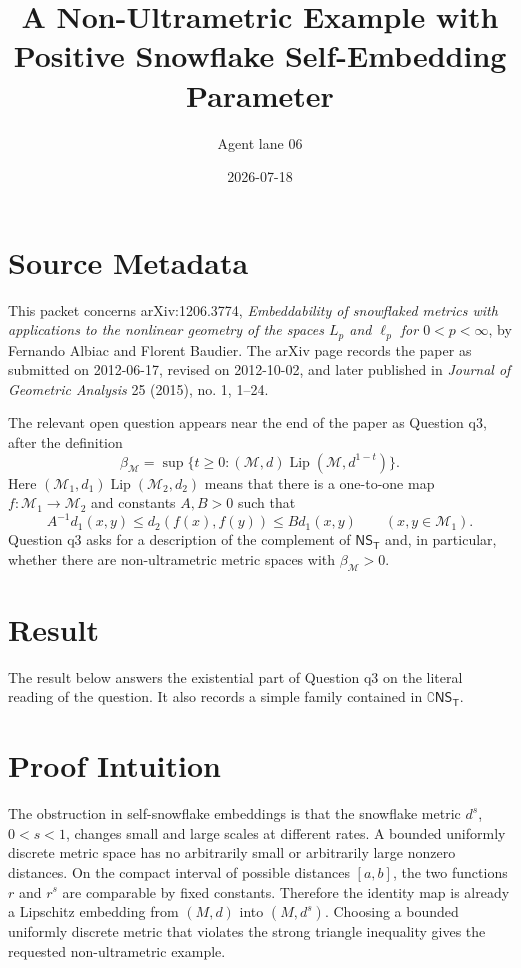 \documentclass[11pt]{article}
\title{A Non-Ultrametric Example with Positive Snowflake Self-Embedding Parameter}
\author{Agent lane 06}
\date{2026-07-18}
\newcommand{\Lip}{\operatorname{Lip}}
\newcommand{\NS}{\mathsf{NS_T}}
\begin{document}
\maketitle

\section*{Source Metadata}

This packet concerns arXiv:1206.3774, \emph{Embeddability of snowflaked metrics
with applications to the nonlinear geometry of the spaces \(L_p\) and
\(\ell_p\) for \(0<p<\infty\)}, by Fernando Albiac and Florent Baudier.  The
arXiv page records the paper as submitted on 2012-06-17, revised on
2012-10-02, and later published in \emph{Journal of Geometric Analysis} 25
(2015), no. 1, 1--24.

The relevant open question appears near the end of the paper as Question
\(\mathrm{q3}\), after the definition
\[
\beta_{\mathcal M}
 =
\sup\{t\ge 0:(\mathcal M,d)\Lip(\mathcal M,d^{1-t})\}.
\]
Here \((\mathcal M_1,d_1)\Lip(\mathcal M_2,d_2)\) means that there is a
one-to-one map \(f:\mathcal M_1\to\mathcal M_2\) and constants \(A,B>0\) such
that
\[
A^{-1}d_1(x,y)\le d_2(f(x),f(y))\le B d_1(x,y)
\qquad (x,y\in\mathcal M_1).
\]
Question \(\mathrm{q3}\) asks for a description of the complement of
\(\mathsf{NS_T}\) and, in particular, whether there are non-ultrametric metric
spaces with \(\beta_{\mathcal M}>0\).

\section*{Result}

The result below answers the existential part of Question \(\mathrm{q3}\) on
the literal reading of the question.  It also records a simple family contained
in \(\complement \NS\).

\section*{Proof Intuition}

The obstruction in self-snowflake embeddings is that the snowflake metric
\(d^s\), \(0<s<1\), changes small and large scales at different rates.  A
bounded uniformly discrete metric space has no arbitrarily small or arbitrarily
large nonzero distances.  On the compact interval of possible distances
\([a,b]\), the two functions \(r\) and \(r^s\) are comparable by fixed
constants.  Therefore the identity map is already a Lipschitz embedding from
\((M,d)\) into \((M,d^s)\).  Choosing a bounded uniformly discrete metric that
violates the strong triangle inequality gives the requested non-ultrametric
example.
\end{document}
